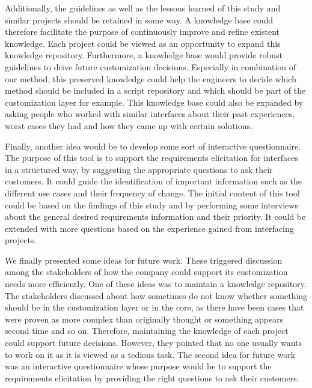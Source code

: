 Additionally, the guidelines as well as the lessons learned of this study and similar projects should be retained in some way. A knowledge base could therefore facilitate the purpose of continuously improve and refine existent knowledge. Each project could be viewed as an opportunity to expand this knowledge repository. Furthermore, a knowledge base would provide robust guidelines to drive future customization decisions. Especially in combination of our method, this preserved knowledge could help the engineers to decide which method should be included in a script repository and which should be part of the customization layer for example. This knowledge base could also be expanded by asking people who worked with similar interfaces about their past experiences, worst cases they had and how they came up with certain solutions. 



Finally, another idea would be to develop some sort of interactive questionnaire. The purpose of this tool is to support the requirements elicitation for interfaces in a structured way, by suggesting the appropriate questions to ask their customers. It could guide the identification of important information such as the different use cases and their frequency of change. The initial content of this tool could be based on the findings of this study and by performing some interviews about the general desired requirements information and their priority. It could be extended with more questions based on the experience gained from interfacing projects.

We finally presented some ideas for future work. These triggered discussion among the stakeholders of how the company could support its customization needs more efficiently. One of these ideas was to maintain a knowledge repository. The stakeholders discussed about how sometimes do not know whether something should be in the customization layer or in the core, as there have been cases that were proven as more complex than originally thought or something appears second time and so on. Therefore, maintaining the knowledge of each project could support future decisions. However, they pointed that no one usually wants to work on it as it is viewed as a tedious task. The second idea for future work was an interactive questionnaire whose purpose would be to support the requirements elicitation by providing the right questions to ask their customers.


